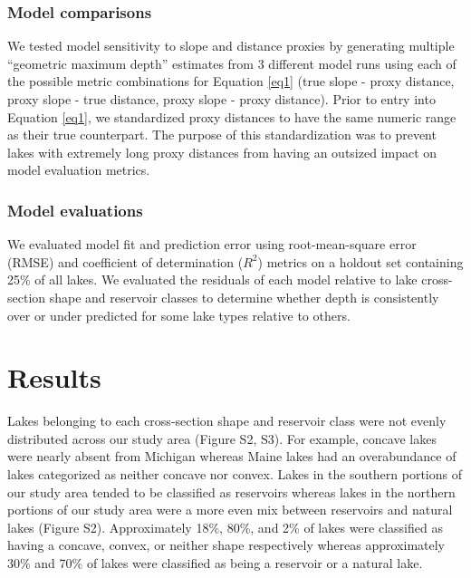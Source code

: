 \documentclass[draft]{agujournal2019}
\begin{document}
\subsubsection{Model comparisons}
\noindent
We tested model sensitivity to slope and distance proxies by generating multiple “geometric maximum depth” estimates from 3 different model runs using each of the possible metric combinations for Equation \ref{eq1} (true slope - proxy distance, proxy slope - true distance, proxy slope - proxy distance). Prior to entry into Equation \ref{eq1}, we standardized proxy distances to have the same numeric range as their true counterpart. The purpose of this standardization was to prevent lakes with extremely long proxy distances from having an outsized impact on model evaluation metrics.

\subsubsection{Model evaluations}
\noindent
We evaluated model fit and prediction error using root-mean-square error (RMSE) and coefficient of determination ($R^2$) metrics on a holdout set containing 25\% of all lakes. We evaluated the residuals of each model relative to lake cross-section shape and reservoir classes to determine whether depth is consistently over or under predicted for some lake types relative to others.

\section{Results}
\noindent
Lakes belonging to each cross-section shape and reservoir class were not evenly distributed across our study area (Figure S2, S3). For example, concave lakes were nearly absent from Michigan whereas Maine lakes had an overabundance of lakes categorized as neither concave nor convex. Lakes in the southern portions of our study area tended to be classified as reservoirs whereas lakes in the northern portions of our study area were a more even mix between reservoirs and natural lakes (Figure S2). Approximately 18\%, 80\%, and 2\% of lakes were classified as having a concave, convex, or neither shape respectively whereas approximately 30\% and 70\% of lakes were classified as being a reservoir or a natural lake.
\end{document}
